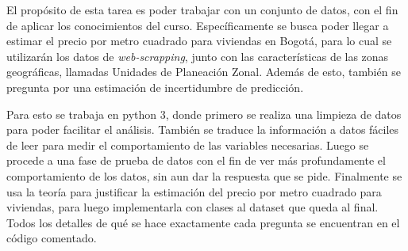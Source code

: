 \documentclass[letterpaper,11pt,oneside]{article}
\begin{document}
	



\begin{resumen}
	El propósito de esta tarea es poder trabajar con un conjunto de datos, con el fin de aplicar los conocimientos del curso. Específicamente se busca poder llegar a estimar el precio por metro cuadrado para viviendas en Bogotá, para lo cual se utilizarán los datos de \textit{web-scrapping}, junto con las características de las zonas geográficas, llamadas Unidades de Planeación Zonal. Además de esto, también se pregunta por una estimación de incertidumbre de predicción.
	
	Para esto se trabaja en python 3, donde primero se realiza una limpieza de datos para poder facilitar el análisis. También se traduce la información a datos fáciles de leer para medir el comportamiento de las variables necesarias. Luego se procede a una fase de prueba de datos con el fin de ver más profundamente el comportamiento de los datos, sin aun dar la respuesta que se pide. Finalmente se usa la teoría para justificar la estimación del precio por metro cuadrado para viviendas, para luego implementarla con clases al dataset que queda al final. Todos los detalles de qué se hace exactamente cada pregunta se encuentran en el código comentado.
\end{resumen}









\end{document}
